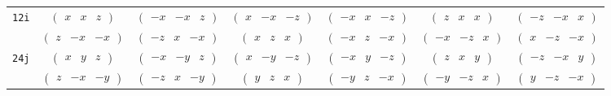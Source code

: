 \documentclass[fleqn,9pt,landscape]{jsarticle}
\begin{document}
\begin{center}
\begin{longtable}{ccccccc}
{\tt 12i} & $ \begin{pmatrix} x & x & z \end{pmatrix} $ & $ \begin{pmatrix} - x & - x & z \end{pmatrix} $ & $ \begin{pmatrix} x & - x & - z \end{pmatrix} $ & $ \begin{pmatrix} - x & x & - z \end{pmatrix} $ & $ \begin{pmatrix} z & x & x \end{pmatrix} $ & $ \begin{pmatrix} - z & - x & x \end{pmatrix} $ \\
& $ \begin{pmatrix} z & - x & - x \end{pmatrix} $ & $ \begin{pmatrix} - z & x & - x \end{pmatrix} $ & $ \begin{pmatrix} x & z & x \end{pmatrix} $ & $ \begin{pmatrix} - x & z & - x \end{pmatrix} $ & $ \begin{pmatrix} - x & - z & x \end{pmatrix} $ & $ \begin{pmatrix} x & - z & - x \end{pmatrix} $ \\ \hline
{\tt 24j} & $ \begin{pmatrix} x & y & z \end{pmatrix} $ & $ \begin{pmatrix} - x & - y & z \end{pmatrix} $ & $ \begin{pmatrix} x & - y & - z \end{pmatrix} $ & $ \begin{pmatrix} - x & y & - z \end{pmatrix} $ & $ \begin{pmatrix} z & x & y \end{pmatrix} $ & $ \begin{pmatrix} - z & - x & y \end{pmatrix} $ \\
& $ \begin{pmatrix} z & - x & - y \end{pmatrix} $ & $ \begin{pmatrix} - z & x & - y \end{pmatrix} $ & $ \begin{pmatrix} y & z & x \end{pmatrix} $ & $ \begin{pmatrix} - y & z & - x \end{pmatrix} $ & $ \begin{pmatrix} - y & - z & x \end{pmatrix} $ & $ \begin{pmatrix} y & - z & - x \end{pmatrix} $ \\

\end{longtable}
\end{center}
\end{document}
